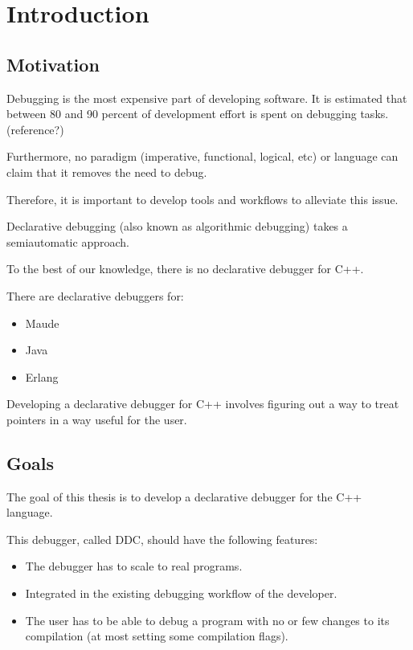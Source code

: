 \chapter{Introduction}
\label{cap:introduccion}


\section{Motivation}

Debugging is the most expensive part of developing software.
It is estimated that between 80 and 90 percent of development effort is spent on debugging tasks.  (reference?)

Furthermore, no paradigm (imperative, functional, logical, etc) or language can claim that it removes the need to debug.

Therefore, it is important to develop tools and workflows to alleviate this issue.

Declarative debugging (also known as algorithmic debugging) takes a semiautomatic approach.

To the best of our knowledge, there is no declarative debugger for C++.

There are declarative debuggers for:
 \begin{itemize}
 \item Maude
\item  Java
\item Erlang
\end{itemize}

Developing a declarative debugger for C++ involves figuring out a way to treat pointers in a way useful for the user.

\section{Goals}
The goal of this thesis is to develop a declarative debugger for the C++ language.

This debugger, called DDC, should have the following features:
\begin{itemize}
  \item The debugger has to scale to real programs.
  \item Integrated in the existing debugging workflow of the developer.
  \item The user has to be able to debug a program with no or few changes to its compilation (at most setting some compilation flags).
\end{itemize}

